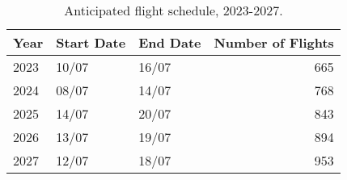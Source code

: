 \begin{table}[ht]
\centering
\begin{tabular}{lllr}
  \hline
Year & Start Date & End Date & Number of Flights \\ 
  \hline
2023 & 10/07 & 16/07 & 665 \\ 
  2024 & 08/07 & 14/07 & 768 \\ 
  2025 & 14/07 & 20/07 & 843 \\ 
  2026 & 13/07 & 19/07 & 894 \\ 
  2027 & 12/07 & 18/07 & 953 \\ 
   \hline
\end{tabular}
\caption{Anticipated flight schedule, 2023-2027. \label{tab:anticipated_schedule}} 
\end{table}
